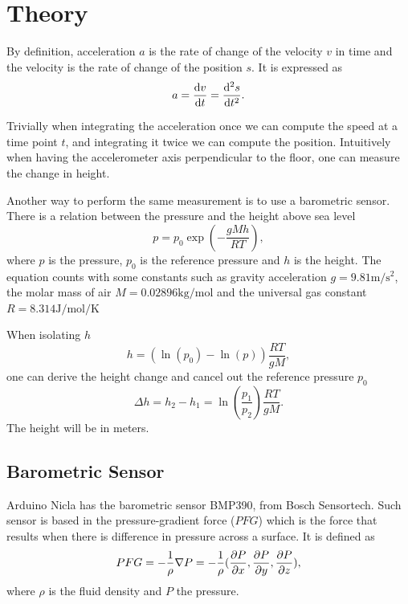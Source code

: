 \documentclass[DIV=14]{scrartcl}
\begin{document}
    \section{Theory}\label{sec:theory}
    By definition, acceleration $a$ is the rate of change of the velocity $v$ in time and the velocity is the rate
    of change of the position $s$.
    It is expressed as
    \begin{equation}
        a = \dv{v}{t} = \dv[2]{s}{t}.
        \label{eq:accelerationDefinition}
    \end{equation}

    Trivially when integrating the acceleration once we can compute the speed at a time point $t$, and integrating
    it twice we can compute the position.
    Intuitively when having the accelerometer axis perpendicular to the floor, one can measure the change in height.

    Another way to perform the same measurement is to use a barometric sensor.
    There is a relation between the pressure and the height above sea level~\cite{labManual}
    \begin{equation}
        p = p_0 \exp(-\frac{gMh}{RT}),
        \label{eq:pressure}
    \end{equation}
    where $p$ is the pressure, $p_0$ is the reference pressure and $h$ is the height.
    The equation counts with some constants such as gravity acceleration $g = 9.81\si{\meter\per\second\squared}$,
    the molar mass of air $M = 0.02896\si{\kilo\gram\per\mol}$ and the universal gas constant
    $R = 8.314\si{\joule\per\mol\per\kelvin}$

    When isolating $h$
    \begin{equation}
        h = (\ln(p_0) - \ln(p))\frac{RT}{gM},
        \label{eq:pressureHeight}
    \end{equation}
    one can derive the height change and cancel out the reference pressure $p_0$
    \begin{equation}
        \Delta h = h_2 - h_1 = \ln(\frac{p_1}{p_2})\frac{RT}{gM}.
        \label{eq:relativePressureHeight}
    \end{equation}
    The height will be in meters.

    \subsection{Barometric Sensor}\label{subsec:barometric-sensor}
    Arduino Nicla has the barometric sensor BMP390, from Bosch Sensortech.
    Such sensor is based in the pressure-gradient force ($PFG$) which is the force that results when there is difference in
    pressure across a surface.
    It is defined as~\cite{Hautala}
    \begin{equation}
        PFG = -\frac{1}{\rho}\nabla{P} = -\frac{1}{\rho}(\pdv{P}{x},\pdv{P}{y},\pdv{P}{z})
        \label{eq:pressureGradientForce},
    \end{equation}
    where $\rho$ is the fluid density and $P$ the pressure.
\end{document}
